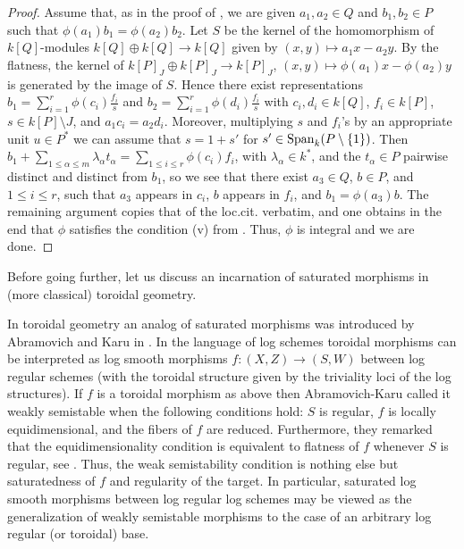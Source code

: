 \documentclass[10pt]{../fichiers-configuration-latex/smfart}
\begin{document}
\begin{proof}
Assume that, as in the proof of \cite[4.1]{LSFI@Kato}, we are given $a_1,a_2\in Q$ and
$b_1,b_2\in P$ such that $\phi(a_1)b_1=\phi(a_2)b_2$. Let $S$ be the kernel of the
homomorphism of $k[Q]$-modules $k[Q]\oplus k[Q]\to k[Q]$ given by $(x,y)\mapsto a_1x-a_2y$.
By the flatness, the kernel of $k[P]_J\oplus k[P]_J\to k[P]_J$, $(x,y)\mapsto\phi(a_1)x-\phi(a_2)y$
is generated by the image of $S$. Hence there exist representations
$b_1=\sum_{i=1}^r\phi(c_i)\frac{f_i}{s}$ and $b_2=\sum_{i=1}^r\phi(d_i)\frac{f_i}{s}$
with $c_i,d_i\in k[Q]$, $f_i\in k[P]$, $s\in k[P]\setminus J$, and $a_1c_i=a_2d_i$.
Moreover, multiplying $s$ and $f_i$'s by an appropriate unit $u\in P^*$ we can assume
that $s=1+s'$ for $s'\in{\rm Span}_k(P\setminus\{1\})$. Then
$b_1+\sum_{1\le\alpha\le m}\lambda_\alpha t_\alpha=\sum_{1\le i \le r}\phi(c_i)f_i$,
with $\lambda_\alpha\in k^*$, and the $t_\alpha\in P$ pairwise distinct and distinct
from $b_1$, so we see that there exist $a_3\in Q$, $b\in P$, and $1\le i\le r$, such
that $a_3$ appears in $c_i$, $b$ appears in $f_i$, and $b_1=\phi(a_3)b$. The remaining
argument copies that of the loc.cit. verbatim, and one obtains in the end that $\phi$
satisfies the condition (v) from \cite[4.1]{LSFI@Kato}. Thus, $\phi$ is integral and
we are done.
\end{proof}

Before going further, let us discuss an incarnation of saturated morphisms in (more classical)
toroidal geometry.

\begin{remark2}
In toroidal geometry an analog of saturated morphisms was introduced by Abramovich and Karu
in \cite{AK@Toroidal}. In the language of log schemes toroidal morphisms can be interpreted
as log smooth morphisms $f{\colon}(X,Z)\to(S,W)$ between log regular schemes (with the toroidal
structure given by the triviality loci of the log structures). If  $f$ is a toroidal morphism
as above then Abramovich-Karu called it weakly semistable when the following conditions hold:
$S$ is regular, $f$ is locally equidimensional, and the fibers of $f$ are reduced. Furthermore,
they remarked that the equidimensionality condition is equivalent to flatness of $f$ whenever
$S$ is regular, see \cite[4.6]{AK@Toroidal}. Thus, the weak semistability condition is nothing
else but saturatedness of $f$ and regularity of the target. In particular, saturated log smooth
morphisms between log regular log schemes may be viewed as the generalization of weakly semistable
morphisms to the case of an arbitrary log regular (or toroidal) base.
\end{remark2}
\end{document}
